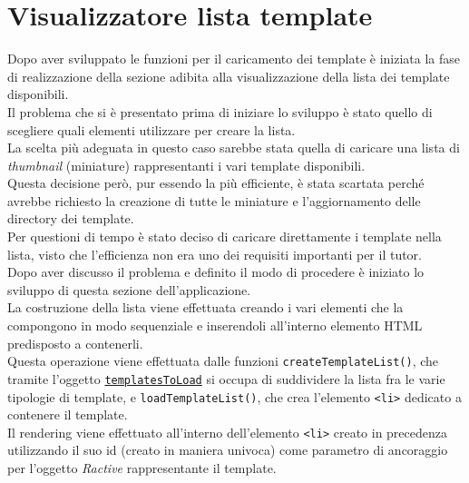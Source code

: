 \section{Visualizzatore lista template}
Dopo aver sviluppato le funzioni per il caricamento dei template è iniziata la fase di realizzazione della sezione adibita alla visualizzazione della lista dei template disponibili.\\
Il problema che si è presentato prima di iniziare lo sviluppo è stato quello di scegliere quali elementi utilizzare per creare la lista.\\
La scelta più adeguata in questo caso sarebbe stata quella di caricare una lista di \textit{thumbnail} (miniature) rappresentanti i vari template disponibili.\\
Questa decisione però, pur essendo la più efficiente, è stata scartata perché avrebbe richiesto la creazione di tutte le miniature e l'aggiornamento delle directory dei template.\\
Per questioni di tempo è stato deciso di caricare direttamente i template nella lista, visto che l'efficienza non era uno dei requisiti importanti per il tutor.\\
Dopo aver discusso il problema e definito il modo di procedere è iniziato lo sviluppo di questa sezione dell'applicazione.\\
La costruzione della lista viene effettuata creando i vari elementi che la compongono in modo sequenziale e inserendoli all'interno elemento HTML predisposto a contenerli.\\
Questa operazione viene effettuata dalle funzioni \texttt{createTemplateList()}, che tramite l'oggetto \hyperref[ttlObject]{\texttt{templatesToLoad}} si occupa di suddividere la lista fra le varie tipologie di template, e \texttt{loadTemplateList()}, che crea l'elemento \texttt{<li>} dedicato a contenere il template.\\
Il rendering viene effettuato all'interno dell'elemento \texttt{<li>} creato in precedenza utilizzando il suo id (creato in maniera univoca) come parametro di ancoraggio per l'oggetto \textit{Ractive} rappresentante il template.

